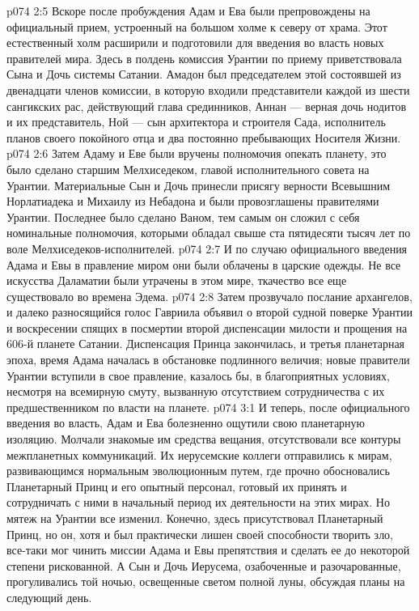 \vs p074 2:5 \pc Вскоре после пробуждения Адам и Ева были препровождены на официальный прием, устроенный на большом холме к северу от храма. Этот естественный холм расширили и подготовили для введения во власть новых правителей мира. Здесь в полдень комиссия Урантии по приему приветствовала Сына и Дочь системы Сатании. Амадон был председателем этой состоявшей из двенадцати членов комиссии, в которую входили представители каждой из шести сангикских рас, действующий глава срединников, Аннан --- верная дочь нодитов и их представитель, Ной --- сын архитектора и строителя Сада, исполнитель планов своего покойного отца и два постоянно пребывающих Носителя Жизни.
\vs p074 2:6 Затем Адаму и Еве были вручены полномочия опекать планету, это было сделано старшим Мелхиседеком, главой исполнительного совета на Урантии. Материальные Сын и Дочь принесли присягу верности Всевышним Норлатиадека и Михаилу из Небадона и были провозглашены правителями Урантии. Последнее было сделано Ваном, тем самым он сложил с себя номинальные полномочия, которыми обладал свыше ста пятидесяти тысяч лет по воле Мелхиседеков\hyp{}исполнителей.
\vs p074 2:7 И по случаю официального введения Адама и Евы в правление миром они были облачены в царские одежды. Не все искусства Даламатии были утрачены в этом мире, ткачество все еще существовало во времена Эдема.
\vs p074 2:8 Затем прозвучало послание архангелов, и далеко разносящийся голос Гавриила объявил о второй судной поверке Урантии и воскресении спящих в посмертии второй диспенсации милости и прощения на 606\hyp{}й планете Сатании. Диспенсация Принца закончилась, и третья планетарная эпоха, время Адама началась в обстановке подлинного величия; новые правители Урантии вступили в свое правление, казалось бы, в благоприятных условиях, несмотря на всемирную смуту, вызванную отсутствием сотрудничества с их предшественником по власти на планете.
\vs p074 3:1 И теперь, после официального введения во власть, Адам и Ева болезненно ощутили свою планетарную изоляцию. Молчали знакомые им средства вещания, отсутствовали все контуры межпланетных коммуникаций. Их иерусемские коллеги отправились к мирам, развивающимся нормальным эволюционным путем, где прочно обосновались Планетарный Принц и его опытный персонал, готовый их принять и сотрудничать с ними в начальный период их деятельности на этих мирах. Но мятеж на Урантии все изменил. Конечно, здесь присутствовал Планетарный Принц, но он, хотя и был практически лишен своей способности творить зло, все\hyp{}таки мог чинить миссии Адама и Евы препятствия и сделать ее до некоторой степени рискованной. А Сын и Дочь Иерусема, озабоченные и разочарованные, прогуливались той ночью, освещенные светом полной луны, обсуждая планы на следующий день.
